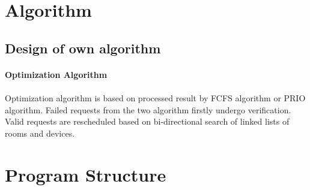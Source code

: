 \documentclass{article}
\begin{document}
    \section{Algorithm}
    \subsection{Design of own algorithm}
        \paragraph{Optimization Algorithm}
        \paragraph{}
            Optimization algorithm is based on processed result by FCFS algorithm or
            PRIO algorithm. Failed requests from the two algorithm firstly undergo
            verification. Valid requests are rescheduled based on bi-directional
            search of linked lists of rooms and devices. 

    \cleardoublepage

    \section{Program Structure}
\end{document}
